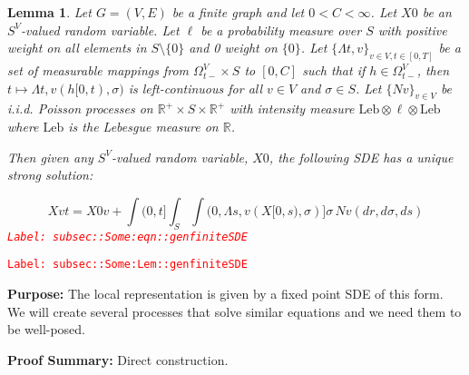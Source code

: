 \documentclass[12pt]{article}
\newcommand{\mb}{\mathbb}
\newcommand{\te}{\text}
\newcommand{\tr}{\textcolor{red}}
\newcommand{\labe}[1]{\tr{\texttt{Label: #1}}}
\newcommand{\purpose}{\textbf{Purpose: }}
\newcommand{\pfsum}{\textbf{Proof Summary: }}
\newcommand{\ind}{\hspace{24pt}}
\renewcommand{\v}{v}							%
\renewcommand{\S}{S}							%
\newcommand{\s}{\sigma}							%
\newcommand{\T}{T}								%
\renewcommand{\t}{t}							%
\newcommand{\sset}{\Omega}						%
\renewcommand{\tt}{s}							%
\newcommand{\X}{X}								%
\newcommand{\carp}[1]{^{#1}}					%
\newcommand{\vsi}[1]{^{#1}}						%
\newcommand{\ts}[1]{_{#1}}						%
\newcommand{\const}{C}							%
\newcommand{\poiss}{N}							%
\newcommand{\leb}{\te{Leb}}						%
\newcommand{\Sm}{\ell}							%
\renewcommand{\r}{r}							%
\newcommand{\ratee}{\Lambda}					%
\newtheorem{lem}[thms]{Lemma}
\begin{document}
\begin{lem}
Let \(G = (V,E)\) be a finite graph and let \(0 < \const{}< \infty\). Let \(\X{}{0}\) be an \(\S\carp{V}\)-valued random variable. Let \(\Sm\) be a probability measure over \(\S\) with positive weight on all elements in \(\S\setminus\{0\}\) and 0 weight on \(\{0\}\). Let \(\{\ratee{\t,\v}\}_{\v \in V,\t\in [0,\T]}\) be a set of measurable mappings from \(\sset\vsi{V}\ts{\t-} \times \S\) to \([0,\const{}]\) such that if \(h \in \sset\vsi{V}\ts{\t-}\), then \(\t\mapsto \ratee{\t,\v}(h[0,\t),\s)\) is left-continuous for all \(\v \in V\) and \(\s \in \S\). Let \(\{\poiss{\v}\}_{\v \in V}\) be i.i.d. Poisson processes on \(\mb{R}^+\times \S\times\mb{R}^+\) with intensity measure \(\leb\otimes\Sm\otimes\leb\) where \(\leb\) is the Lebesgue measure on \(\mb{R}\).

\ind Then given any \(\S\carp{V}\)-valued random variable, \(\X{}{0}\), the following SDE has a unique strong solution:

\begin{equation}
\X{\v}{\t} = \X{0}{\v} + \int{(0,\t]}\int_\S\int{(0,\ratee{\tt,\v}(\X{}{[0,\tt)},\s)]}  \s\,\poiss{\v}(d\r,d\s,d\tt)
\label{subsec::Some:eqn::genfiniteSDE}
\end{equation}
\labe{subsec::Some:eqn::genfiniteSDE}
\label{subsec::Some:Lem::genfiniteSDE}
\end{lem}
\labe{subsec::Some:Lem::genfiniteSDE}

\purpose The local representation is given by a fixed point SDE of this form. We will create several processes that solve similar equations and we need them to be well-posed.

\pfsum Direct construction.
\end{document}
